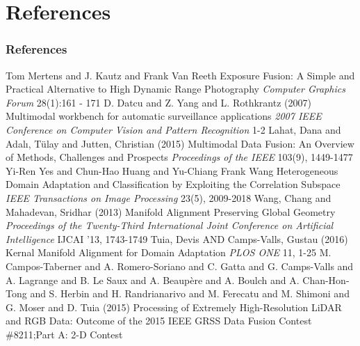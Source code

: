 \documentclass{beamer}
\begin{document}

\section{References}
\begin{frame}[allowframebreaks]
  \frametitle{References}
  \footnotesize{
    \begin{thebibliography}{99} %
     Tom Mertens and J. Kautz and Frank Van Reeth
      \newblock Exposure Fusion: A Simple and Practical Alternative to High Dynamic Range Photography
      \newblock \emph{Computer Graphics Forum} 28(1):161 - 171
     D. Datcu and Z. Yang and L. Rothkrantz (2007)
      \newblock Multimodal workbench for automatic surveillance applications
      \newblock \emph{2007 IEEE Conference on Computer Vision and Pattern Recognition} 1-2
     Lahat, Dana and Adal{\i}, T{\"u}lay and Jutten, Christian (2015)
      \newblock Multimodal Data Fusion: An Overview of Methods, Challenges and Prospects
      \newblock \emph{Proceedings of the IEEE } 103(9), 1449-1477
     Yi-Ren Yes and Chun-Hao Huang and Yu-Chiang Frank Wang
      \newblock Heterogeneous Domain Adaptation and Classification by Exploiting the Correlation Subspace
      \newblock \emph{IEEE Transactions on Image Processing} 23(5), 2009-2018
     Wang, Chang and Mahadevan, Sridhar (2013)
      \newblock Manifold Alignment Preserving Global Geometry
      \newblock \emph{Proceedings of the Twenty-Third International Joint Conference on Artificial Intelligence} IJCAI '13, 1743-1749
     Tuia, Devis AND Camps-Valls, Gustau (2016)
      \newblock Kernal Manifold Alignment for Domain Adaptation
      \newblock \emph{PLOS ONE} 11, 1-25
     M. Campos-Taberner and A. Romero-Soriano and C. Gatta and G. Camps-Valls and A. Lagrange and B. Le Saux and A. Beaupère and A. Boulch and A. Chan-Hon-Tong and S. Herbin and H. Randrianarivo and M. Ferecatu and M. Shimoni and G. Moser and D. Tuia (2015)
      \newblock Processing of Extremely High-Resolution LiDAR and RGB Data: Outcome of the 2015 IEEE GRSS Data Fusion Contest \#8211;Part A: 2-D Contest

\end{thebibliography}}
\end{frame}
\end{document}

